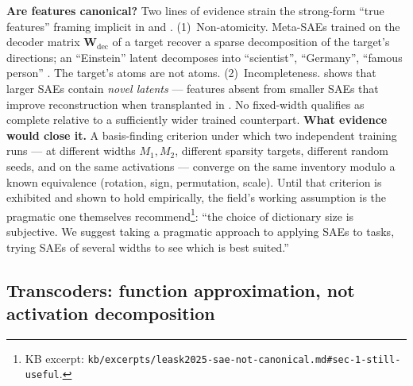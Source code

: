 \begin{contradiction}
\textbf{Are  features canonical?} Two lines of evidence strain the
strong-form ``true features'' framing implicit in
\citet{bricken2023-monosemanticity} and
\citet{templeton2024-scaling-monosemanticity}.
\textsf{(1)~Non-atomicity.} Meta-SAEs trained on the decoder matrix
$\mathbf{W}_\text{dec}$ of a target  recover a sparse decomposition
of the target's  directions; an ``Einstein'' latent decomposes
into ``scientist'', ``Germany'', ``famous person''
\citep[\S 1]{leask2025-sae-not-canonical}. The target's atoms are not
atoms.
\textsf{(2)~Incompleteness.}  shows that larger SAEs
contain \emph{novel latents} --- features absent from smaller SAEs
that improve reconstruction when transplanted in
\citep[abstract]{leask2025-sae-not-canonical}. No fixed-width 
qualifies as complete relative to a sufficiently wider trained
counterpart.
\textbf{What evidence would close it.} A basis-finding criterion under
which two independent  training runs --- at different widths
$M_1, M_2$, different sparsity targets, different random seeds, and
on the same activations --- converge on the same  inventory
modulo a known equivalence (rotation, sign, permutation, scale).
Until that criterion is exhibited and shown to hold empirically, the
field's working assumption is the pragmatic one
\citet[\S 1]{leask2025-sae-not-canonical} themselves
recommend\footnote{KB excerpt:
\nolinkurl{kb/excerpts/leask2025-sae-not-canonical.md#sec-1-still-useful}.}:
``the choice of dictionary size is subjective. We suggest taking a
pragmatic approach to applying SAEs to 
tasks, trying SAEs of several widths to see which is best
suited.''~\citep[\S 1]{leask2025-sae-not-canonical}
\end{contradiction}

\subsection{Transcoders: function approximation, not activation
decomposition}
\label{sec:transcoder-canonicality}

